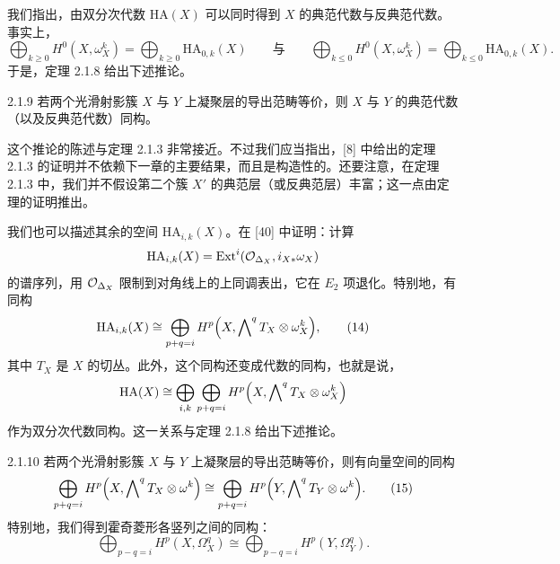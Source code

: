 我们指出，由双分次代数 $\mathrm{HA}(X)$ 可以同时得到 $X$ 的典范代数与反典范代数。事实上，
\begin{equation*}
\bigoplus_{k\geqslant0}H^{0}(X,\omega^{k}_{X})=\bigoplus_{k\geqslant0}\mathrm{HA}_{0,k}(X)
\qquad\text{与}\qquad
\bigoplus_{k\leqslant0}H^{0}(X,\omega^{k}_{X})=\bigoplus_{k\leqslant0}\mathrm{HA}_{0,k}(X).
\end{equation*}
于是，定理 2.1.8 给出下述推论。

\begin{corollary}{2.1.9}
若两个光滑射影簇 $X$ 与 $Y$ 上凝聚层的导出范畴等价，则 $X$ 与 $Y$ 的典范代数（以及反典范代数）同构。
\end{corollary}

这个推论的陈述与定理 2.1.3 非常接近。不过我们应当指出，[8] 中给出的定理 2.1.3 的证明并不依赖下一章的主要结果，而且是构造性的。还要注意，在定理 2.1.3 中，我们并不假设第二个簇 $X'$ 的典范层（或反典范层）丰富；这一点由定理的证明推出。

我们也可以描述其余的空间 $\mathrm{HA}_{i,k}(X)$。在 [40] 中证明：计算
\begin{equation*}
\mathrm{HA}_{i,k}(X)=\operatorname{Ext}^{i}(\mathcal{O}_{\Delta_X},i_{X*}\omega_X)
\end{equation*}
的谱序列，用 $\mathcal{O}_{\Delta_X}$ 限制到对角线上的上同调表出，它在 $E_2$ 项退化。特别地，有同构
\begin{equation}
\mathrm{HA}_{i,k}(X)\cong\bigoplus_{p+q=i}H^{p}\Bigl(X,\bigwedge\nolimits^{q}T_X\otimes\omega^{k}_{X}\Bigr), \tag{14}
\end{equation}
其中 $T_X$ 是 $X$ 的切丛。此外，这个同构还变成代数的同构，也就是说，
\begin{equation*}
\mathrm{HA}(X)\cong\bigoplus_{i,k}\bigoplus_{p+q=i}H^{p}\Bigl(X,\bigwedge\nolimits^{q}T_X\otimes\omega^{k}_{X}\Bigr)
\end{equation*}
作为双分次代数同构。这一关系与定理 2.1.8 给出下述推论。

\begin{corollary}{2.1.10}
若两个光滑射影簇 $X$ 与 $Y$ 上凝聚层的导出范畴等价，则有向量空间的同构
\begin{equation}
\bigoplus_{p+q=i}H^{p}\Bigl(X,\bigwedge\nolimits^{q}T_X\otimes\omega^{k}\Bigr)
\cong
\bigoplus_{p+q=i}H^{p}\Bigl(Y,\bigwedge\nolimits^{q}T_Y\otimes\omega^{k}\Bigr). \tag{15}
\end{equation}
特别地，我们得到霍奇菱形各竖列之间的同构：
\begin{equation}
\bigoplus_{p-q=i}H^{p}(X,\Omega^{q}_{X})\cong\bigoplus_{p-q=i}H^{p}(Y,\Omega^{q}_{Y}). \tag{16}
\end{equation}
\end{corollary}

